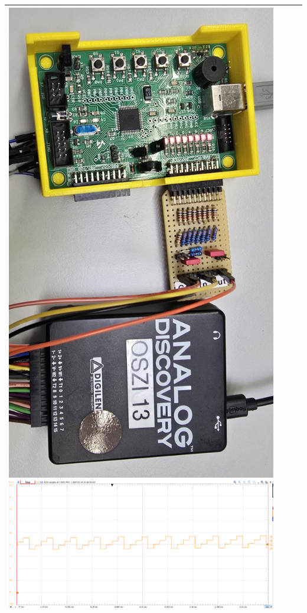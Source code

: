 \documentclass{article}
\begin{document}
\begin{tabular}{|p{4.5cm}|p{7.5cm}|p{2.5cm}|p{2cm}|}
{        \includegraphics[width=0.5\linewidth, angle=90]{img/Aufbau_01.jpg}
        \includegraphics[width=0.9\linewidth]{img/Signal_07.png}
        \vspace{2cm}
    }\\
    \hline
\end{tabular}
\end{document}
